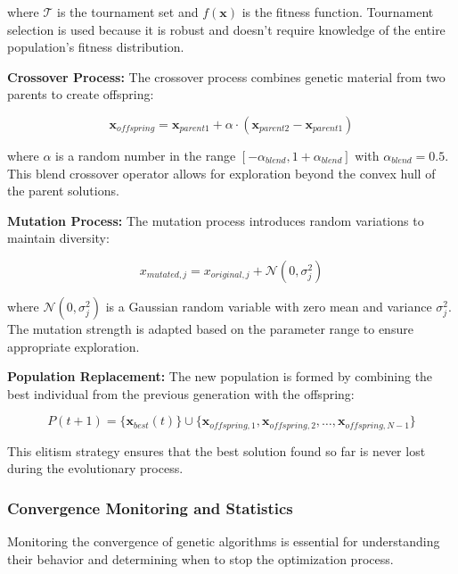 \documentclass[12pt,a4paper]{article}
\begin{document}
where $\mathcal{T}$ is the tournament set and $f(\mathbf{x})$ is the fitness function. Tournament selection is used because it is robust and doesn't require knowledge of the entire population's fitness distribution.

\textbf{Crossover Process:} The crossover process combines genetic material from two parents to create offspring:

\begin{equation}\label{Eq.crossover_process}
\mathbf{x}_{offspring} = \mathbf{x}_{parent1} + \alpha \cdot (\mathbf{x}_{parent2} - \mathbf{x}_{parent1})
\end{equation}

where $\alpha$ is a random number in the range $[-\alpha_{blend}, 1 + \alpha_{blend}]$ with $\alpha_{blend} = 0.5$. This blend crossover operator allows for exploration beyond the convex hull of the parent solutions.

\textbf{Mutation Process:} The mutation process introduces random variations to maintain diversity:

\begin{equation}\label{Eq.mutation_process}
x_{mutated,j} = x_{original,j} + \mathcal{N}(0, \sigma_j^2)
\end{equation}

where $\mathcal{N}(0, \sigma_j^2)$ is a Gaussian random variable with zero mean and variance $\sigma_j^2$. The mutation strength is adapted based on the parameter range to ensure appropriate exploration.

\textbf{Population Replacement:} The new population is formed by combining the best individual from the previous generation with the offspring:

\begin{equation}\label{Eq.population_replacement_detailed}
P(t+1) = \{\mathbf{x}_{best}(t)\} \cup \{\mathbf{x}_{offspring,1}, \mathbf{x}_{offspring,2}, \ldots, \mathbf{x}_{offspring,N-1}\}
\end{equation}

This elitism strategy ensures that the best solution found so far is never lost during the evolutionary process.

\subsubsection{Convergence Monitoring and Statistics}

Monitoring the convergence of genetic algorithms is essential for understanding their behavior and determining when to stop the optimization process.
\end{document}

